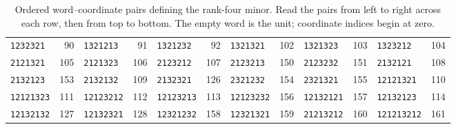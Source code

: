 \begin{table}[!ht]
\begin{tabular}{lr lr lr lr lr lr }
\texttt{1232321} & 90 & \texttt{1321213} & 91 & \texttt{1321232} & 92 & \texttt{1321321} & 102 & \texttt{1321323} & 103 & \texttt{1323212} & 104\\
\texttt{2121321} & 105 & \texttt{2121323} & 106 & \texttt{2123212} & 107 & \texttt{2123213} & 150 & \texttt{2123232} & 151 & \texttt{2132121} & 108\\
\texttt{2132123} & 153 & \texttt{2132132} & 109 & \texttt{2132321} & 126 & \texttt{2321232} & 154 & \texttt{2321321} & 155 & \texttt{12121321} & 110\\
\texttt{12121323} & 111 & \texttt{12123212} & 112 & \texttt{12123213} & 113 & \texttt{12123232} & 156 & \texttt{12132121} & 157 & \texttt{12132123} & 114\\
\texttt{12132132} & 127 & \texttt{12132321} & 128 & \texttt{12321232} & 158 & \texttt{12321321} & 159 & \texttt{21213212} & 160 & \texttt{121213212} & 161\\
\bottomrule
\end{tabular}
\caption{Ordered word--coordinate pairs defining the rank-four minor. Read the pairs from left to right across each row, then from top to bottom. The empty word is the unit; coordinate indices begin at zero.}
\label{tab:rank4-word-minor}
\end{table}
